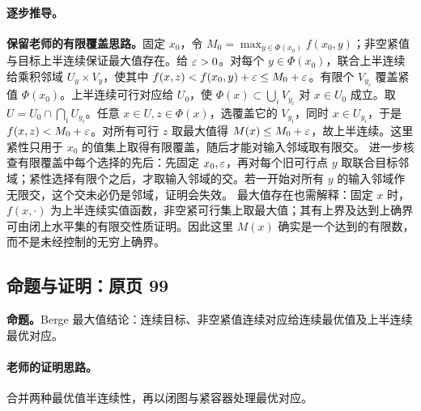 \paragraph{逐步推导。}\textbf{保留老师的有限覆盖思路。}固定 $x_0$，令 $M_0=\max_{y\in\Phi(x_0)}f(x_0,y)$；非空紧值与目标上半连续保证最大值存在。给 $\varepsilon>0$。对每个 $y\in\Phi(x_0)$，联合上半连续给乘积邻域 $U_y\times V_y$，使其中 $f(x,z)<f(x_0,y)+\varepsilon\le M_0+\varepsilon$。有限个 $V_{y_i}$ 覆盖紧值 $\Phi(x_0)$。上半连续可行对应给 $U_0$，使 $\Phi(x)\subset\bigcup_iV_{y_i}$ 对 $x\in U_0$ 成立。取 $U=U_0\cap\bigcap_iU_{y_i}$。任意 $x\in U,z\in\Phi(x)$，选覆盖它的 $V_{y_i}$，同时 $x\in U_{y_i}$，于是 $f(x,z)<M_0+\varepsilon$。对所有可行 $z$ 取最大值得 $M(x)\le M_0+\varepsilon$，故上半连续。这里紧性只用于 $x_0$ 的值集上取得有限覆盖，随后才能对输入邻域取有限交。
进一步核查有限覆盖中每个选择的先后：先固定 $x_0,\varepsilon$，再对每个旧可行点 $y$ 取联合目标邻域；紧性选择有限个之后，才取输入邻域的交。若一开始对所有 $y$ 的输入邻域作无限交，这个交未必仍是邻域，证明会失效。
最大值存在也需解释：固定 $x$ 时，$f(x,\cdot)$ 为上半连续实值函数，非空紧可行集上取最大值；其有上界及达到上确界可由闭上水平集的有限交性质证明。因此这里 $M(x)$ 确实是一个达到的有限数，而不是未经控制的无穷上确界。


\subsection{命题与证明：原页 99}

\textbf{命题。}Berge 最大值结论：连续目标、非空紧值连续对应给连续最优值及上半连续最优对应。

\paragraph{老师的证明思路。}合并两种最优值半连续性，再以闭图与紧容器处理最优对应。

